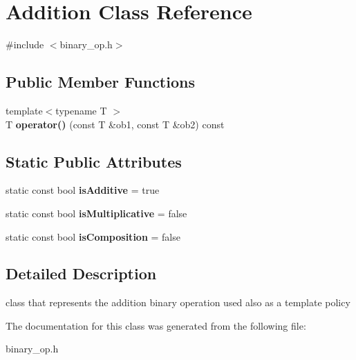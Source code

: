 \hypertarget{classAddition}{\section{\-Addition \-Class \-Reference}
\label{classAddition}
}


{\ttfamily \#include $<$binary\-\_\-op.\-h$>$}

\subsection*{\-Public \-Member \-Functions}
\begin{DoxyCompactItemize}
\item 
\hypertarget{classAddition_a0cd0e60cd506c9e640d89422303d77b7}{{\footnotesize template$<$typename T $>$ }\\\-T {\bfseries operator()} (const \-T \&ob1, const \-T \&ob2) const }\label{classAddition_a0cd0e60cd506c9e640d89422303d77b7}

\end{DoxyCompactItemize}
\subsection*{\-Static \-Public \-Attributes}
\begin{DoxyCompactItemize}
\item 
\hypertarget{classAddition_a24b52cf787fbb2997cca7fabd26feb9b}{static const bool {\bfseries is\-Additive} = true}\label{classAddition_a24b52cf787fbb2997cca7fabd26feb9b}

\item 
\hypertarget{classAddition_a5e060aac1855b53aa87849ea9e439cd9}{static const bool {\bfseries is\-Multiplicative} = false}\label{classAddition_a5e060aac1855b53aa87849ea9e439cd9}

\item 
\hypertarget{classAddition_a7fce2d48cdd7335298e138775b9fde7b}{static const bool {\bfseries is\-Composition} = false}\label{classAddition_a7fce2d48cdd7335298e138775b9fde7b}

\end{DoxyCompactItemize}


\subsection{\-Detailed \-Description}
class that represents the addition binary operation used also as a template policy 

\-The documentation for this class was generated from the following file\-:\begin{DoxyCompactItemize}
\item 
binary\-\_\-op.\-h\end{DoxyCompactItemize}
